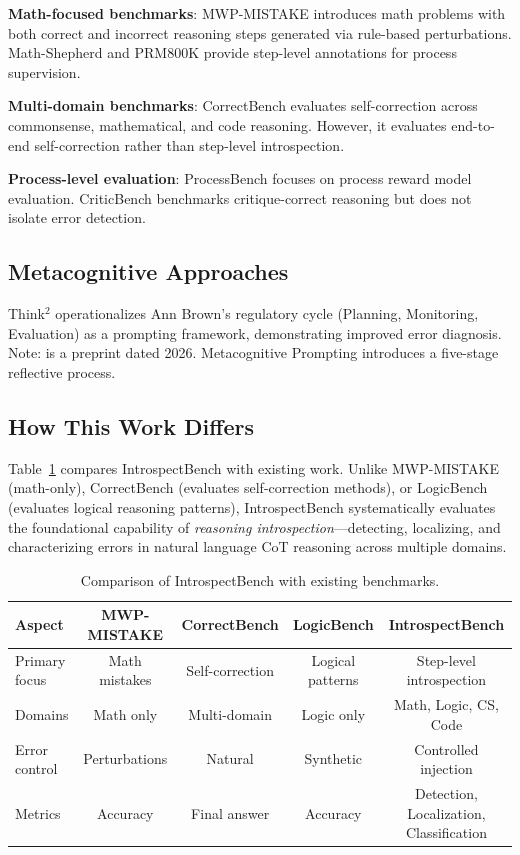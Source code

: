 \documentclass{article}
\begin{document}
\textbf{Math-focused benchmarks}: MWP-MISTAKE \citep{singh2025exposing} introduces math problems with both correct and incorrect reasoning steps generated via rule-based perturbations. Math-Shepherd \citep{wang2023mathshepherd} and PRM800K \citep{lightman2023let} provide step-level annotations for process supervision.

\textbf{Multi-domain benchmarks}: CorrectBench \citep{tie2025correctbench} evaluates self-correction across commonsense, mathematical, and code reasoning. However, it evaluates end-to-end self-correction rather than step-level introspection.

\textbf{Process-level evaluation}: ProcessBench \citep{zheng2024processbench} focuses on process reward model evaluation. CriticBench \citep{lin2024criticbench} benchmarks critique-correct reasoning but does not isolate error detection.

\subsection{Metacognitive Approaches}

Think$^2$ \citep{elenjical2026think2} operationalizes Ann Brown's regulatory cycle (Planning, Monitoring, Evaluation) as a prompting framework, demonstrating improved error diagnosis. Note: \citet{elenjical2026think2} is a preprint dated 2026. Metacognitive Prompting \citep{wang2024metacognitive} introduces a five-stage reflective process.

\subsection{How This Work Differs}

Table~\ref{tab:comparison} compares IntrospectBench with existing work. Unlike MWP-MISTAKE (math-only), CorrectBench (evaluates self-correction methods), or LogicBench \citep{parmar2024logicbench} (evaluates logical reasoning patterns), IntrospectBench systematically evaluates the foundational capability of \textit{reasoning introspection}---detecting, localizing, and characterizing errors in natural language CoT reasoning across multiple domains.

\begin{table}[t]
\caption{Comparison of IntrospectBench with existing benchmarks.}
\label{tab:comparison}
\centering
\begin{tabular}{lcccc}
\toprule
\textbf{Aspect} & \textbf{MWP-MISTAKE} & \textbf{CorrectBench} & \textbf{LogicBench} & \textbf{IntrospectBench} \\
\midrule
Primary focus & Math mistakes & Self-correction & Logical patterns & Step-level introspection \\
Domains & Math only & Multi-domain & Logic only & Math, Logic, CS, Code \\
Error control & Perturbations & Natural & Synthetic & Controlled injection \\
Metrics & Accuracy & Final answer & Accuracy & Detection, Localization, Classification \\
\bottomrule
\end{tabular}
\end{table}
\end{document}
